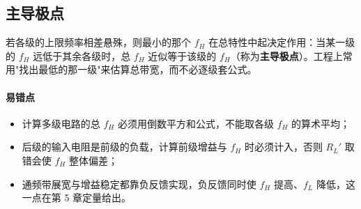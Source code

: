 \subsection{主导极点}

若各级的上限频率相差悬殊，则最小的那个 $f_H$ 在总特性中起决定作用：当某一级的 $f_H$ 远低于其余各级时，总 $f_H$ 近似等于该级的 $f_H$（称为\textbf{主导极点}）。工程上常用"找出最低的那一级"来估算总带宽，而不必逐级套公式。

\paragraph{易错点}
\begin{itemize}
    \item 计算多级电路的总 $f_H$ 必须用倒数平方和公式，不能取各级 $f_H$ 的算术平均；
    \item 后级的输入电阻是前级的负载，计算前级增益与 $f_H$ 时必须计入，否则 $R_L'$ 取错会使 $f_H$ 整体偏差；
    \item 通频带展宽与增益稳定都靠负反馈实现，负反馈同时使 $f_H$ 提高、$f_L$ 降低，这一点在第 5 章定量给出。
\end{itemize}
